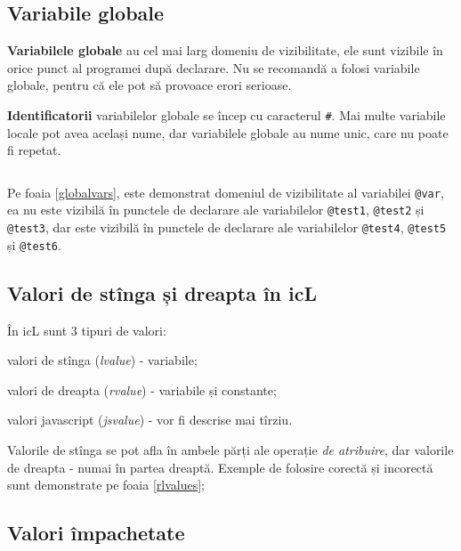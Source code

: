 \subsection{Variabile globale}

\textbf{Variabilele globale} au cel mai larg domeniu de vizibilitate, ele sunt vizibile în orice punct al programei după declarare. Nu se recomandă a folosi variabile globale, pentru că ele pot să provoace erori serioase.

{\bf Identificatorii} variabilelor globale se încep cu caracterul {\color{blue2}\texttt{#}}. Mai multe variabile locale pot avea același nume, dar variabilele globale au nume unic, care nu poate fi repetat.

\begin{sourcecode}
\label{localvars}
\inputminted[linenos]{icl}{../sources/localvars.icL}
\end{sourcecode}

Pe foaia \ref{globalvars}, este demonstrat domeniul de vizibilitate al variabilei \texttt{@var}, ea nu este vizibilă în punctele de declarare ale variabilelor \texttt{@test1}, \texttt{@test2} și \texttt{@test3}, dar este vizibilă în punctele de declarare ale variabilelor \texttt{@test4}, \texttt{@test5} și \texttt{@test6}.

\subsection{Valori de stînga și dreapta în icL}

În icL sunt 3 tipuri de valori:

\begin{icEnum}
\item
	valori de stînga ({\it lvalue}) - variabile;
\item
	valori de dreapta ({\it rvalue}) - variabile și constante;
\item
	valori javascript ({\it jsvalue}) - vor fi descrise mai tîrziu.
\end{icEnum}

Valorile de stînga se pot afla în ambele părți ale operație {\it de atribuire}, dar valorile de dreapta - numai în partea dreaptă. Exemple de folosire corectă și incorectă sunt demonstrate pe foaia \ref{rlvalues};

\subsection{Valori împachetate}

